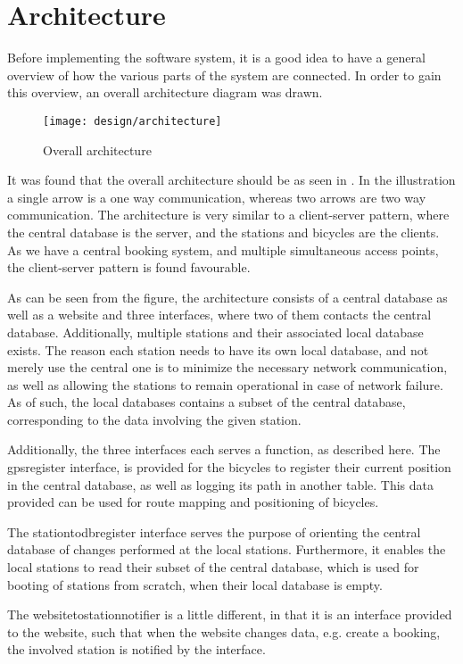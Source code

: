 \section{Architecture}
Before implementing the software system, it is a good idea to have a general overview of how the various parts of the system are connected.
In order to gain this overview, an overall architecture diagram was drawn.
\begin{figure}[h]
	\centering
	\texttt{[image: design/architecture]}
	\caption{Overall architecture}\label{fig:overallarch}
\end{figure}

It was found that the overall architecture should be as seen in .
In the illustration a single arrow is a one way communication, whereas two arrows are two way communication.
The architecture is very similar to a client-server pattern, where the central database is the server, and the stations and bicycles are the clients.
As we have a central booking system, and multiple simultaneous access points, the client-server pattern is found favourable.

As can be seen from the figure, the architecture consists of a central database as well as a website and three interfaces, where two of them contacts the central database.
Additionally, multiple stations and their associated local database exists.
The reason each station needs to have its own local database, and not merely use the central one is to minimize the necessary network communication, as well as allowing the stations to remain operational in case of network failure.
As of such, the local databases contains a subset of the central database, corresponding to the data involving the given station.

Additionally, the three interfaces each serves a function, as described here.
The gpsregister interface, is provided for the bicycles to register their current position in the central database, as well as logging its path in another table.
This data provided can be used for route mapping and positioning of bicycles.

The stationtodbregister interface serves the purpose of orienting the central database of changes performed at the local stations. Furthermore, it enables the local stations to read their subset of the central database, which is used for booting of stations from scratch, when their local database is empty.

The websitetostationnotifier is a little different, in that it is an interface provided to the website, such that when the website changes data, e.g. create a booking, the involved station is notified by the interface.


